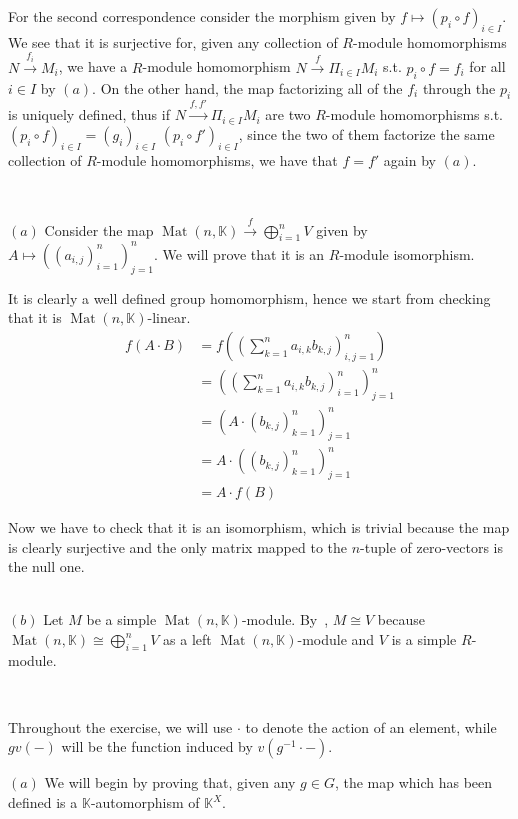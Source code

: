 \documentclass{article}
\newcommand{\numberset}{\mathbb}
\newcommand{\K}{\numberset{K}}
\newcommand{\exercise}[1]{\noindent {\bf Exercise #1}}
\DeclareMathOperator{\Mat}{Mat}
\begin{document}
For the second correspondence consider the morphism given by $f\mapsto
(p_i\circ f)_{i\in I}$. We see that it is surjective for, given any collection
of $R$-module homomorphisms $N\xrightarrow{f_i} M_i$, we have a $R$-module 
homomorphism $N\xrightarrow{f}\Pi_{i\in I} M_i$ s.t. $p_i\circ f=f_i$ for
all $i\in I$ by $(a)$. On the other hand, the map factorizing all of the $f_i$
through the $p_i$ is
uniquely defined, thus if $N\xrightarrow{f,f'} \Pi_{i\in I} M_i$ are two $R$-module 
homomorphisms s.t. $(p_i\circ f)_{i\in I}=(g_i)_{i\in I}$ $(p_i\circ f')_{i\in I}$,
since the two of them factorize the same collection of $R$-module homomorphisms,
we have that $f=f'$ again by $(a)$.


~\\
\exercise{3.11}

$(a)$ Consider the map $\Mat(n,\K)\xrightarrow{f} \bigoplus_{i=1}^n V$ given by
$A\mapsto ((a_{i,j})_{i=1}^n)_{j=1}^n$. We will prove that it is an $R$-module
isomorphism.

It is clearly a well defined group homomorphism, hence we start from checking
that it is $\Mat(n,\K)$-linear.
\begin{align*}
    f(A\cdot B) & =f\left(\left(\sum_{k=1}^n
    a_{i,k}b_{k,j}\right)_{i,j=1}^n\right) \\
    & =\left(\left(\sum_{k=1}^n a_{i,k}b_{k,j}\right)_{i=1}^n\right)_{j=1}^n \\
    & =(A\cdot (b_{k,j})_{k=1}^n)_{j=1}^n \\
    & =A\cdot ((b_{k,j})_{k=1}^n)_{j=1}^n \\
    & =A\cdot f(B)
\end{align*}

Now we have to check that it is an isomorphism, which is trivial because the map
is clearly surjective and the only matrix mapped to the $n$-tuple of zero-vectors
is the null one.

~\\
$(b)$ Let $M$ be a simple $\Mat(n,\K)$-module. By~\cite[prop. 9.7]{Tor10}, $M
\cong V$ because $\Mat(n,\K)\cong \bigoplus_{i=1}^n V$ as a left
$\Mat(n,\K)$-module and $V$ is a simple $R$-module.


~\\
\exercise{4.5}

Throughout the exercise, we will use $\cdot$ to denote the action of an element,
while $gv(-)$ will be the function induced by $v(g^{-1}\cdot -)$.

$(a)$ We will begin by proving that, given any $g\in G$, the map which has been
defined is a $\K$-automorphism of $\K^X$.
\end{document}

